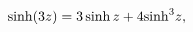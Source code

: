 \[\mathop{\sinh\/}\nolimits\!\left(3z\right)=3\mathop{\sinh\/}\nolimits z+4{%
\mathop{\sinh\/}\nolimits^{3}}z,\]